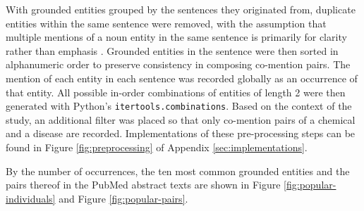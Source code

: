 \documentclass[10pt, oneside]{article}
\begin{document}
With grounded entities grouped by the sentences they originated from, duplicate entities within the same sentence were removed, with the assumption that multiple mentions of a noun entity in the same sentence is primarily for clarity rather than emphasis \cite{clark1979search}. Grounded entities in the sentence were then sorted in alphanumeric order to preserve consistency in composing co-mention pairs. The mention of each entity in each sentence was recorded globally as an occurrence of that entity. All possible in-order combinations of entities of length 2 were then generated with Python's \verb|itertools.combinations|. Based on the context of the study, an additional filter was placed so that only co-mention pairs of a chemical and a disease are recorded. Implementations of these pre-processing steps can be found in Figure \ref{fig:preprocessing} of Appendix \ref{sec:implementations}.

By the number of occurrences, the ten most common grounded entities and the pairs thereof in the PubMed abstract texts are shown in Figure \ref{fig:popular-individuals} and Figure \ref{fig:popular-pairs}.
\end{document}
